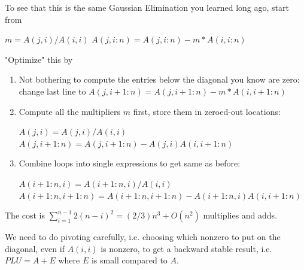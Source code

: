 \documentclass[11pt]{article}
\numberwithin{equation}{section}
\begin{document}
To see that this is the same Gaussian Elimination you learned long ago, start from
\begin{algorithmfrm}
    \begin{algorithmic}[1]
            \State $ m = A(j,i)/A(i,i)$
            \State $ A(j,i:n) = A(j,i:n) - m*A(i,i:n)$
            \EndFor
        \EndFor
    \end{algorithmic}
\end{algorithmfrm}
"Optimize" this by \begin{enumerate}
    \item Not bothering to compute the entries below the diagonal you know are zero: change last line to $A(j,i+1:n) = A(j,i+1:n) - m*A(i,i+1:n)$
    \item Compute all the multipliers $m$ first, store them in zeroed-out locations:\begin{algorithmfrm}
        \begin{algorithmic}[1]
                    \State $A(j,i) = A(j,i)/A(i,i)$
                \EndFor
                    \State $A(j,i+1:n) = A(j,i+1:n) - A(j,i)A(i,i+1:n)$
                \EndFor
            \EndFor
        \end{algorithmic}
    \end{algorithmfrm}
    \item Combine loops into single expressions to get same as before:\begin{algorithmfrm}
        \begin{algorithmic}[1]
                \State $A(i+1:n,i) = A(i+1:n,i)/A(i,i)$
                \State $A(i+1:n,i+1:n) = A(i+1:n,i+1:n) - A(i+1:n,i)A(i,i+1:n)$
            \EndFor
        \end{algorithmic}
    \end{algorithmfrm}
\end{enumerate}
The cost is $\sum_{i=1}^{n-1} 2(n-i)^2 = (2/3)n^3 + O(n^2)$ multiplies and adds.

We need to do pivoting carefully, i.e. choosing which nonzero to put on the diagonal, even if $A(i,i)$ is nonzero, to get a backward stable result, i.e. 
$PLU = A + E$ where $E$ is small compared to $A$. 
\end{document}
